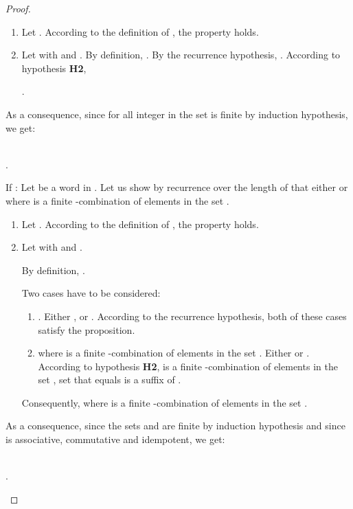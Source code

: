 \documentclass{article}
\begin{document}
\begin{proof}
          \begin{enumerate}
            \item Let . According to the definition of , the property holds.
            \item Let  with  and . By definition,   . By the recurrence hypothesis,  . According to hypothesis \textbf{H2},
            
            \centerline{   }
            
            \centerline{ .}
            
          \end{enumerate}  
          
         As a consequence, since for all integer  in  the set  is finite by induction hypothesis, we get:
       \begin{center}
        \\
        .
      \end{center}
    
    If :
        Let  be a word in .
          Let us show by recurrence over the length of  that either  or  where  is a finite -combination of elements in the set .
          
          \begin{enumerate}
            \item Let . According to the definition of , the property holds.
            \item Let  with  and .
            
            By definition, .
            
            Two cases have to be considered:
             
             \begin{enumerate}
               \item . Either  , or . According to the recurrence hypothesis, both of these cases satisfy the proposition.
               
               \item  where  is a finite -combination of elements in the set . Either  or . According to hypothesis \textbf{H2},  is a finite -combination of elements in the set , set that equals  is a suffix of .
             \end{enumerate} 
             
             Consequently,  where  is a finite -combination of elements in the set . 
          \end{enumerate} 
          
          As a consequence, since the sets  and  are finite by induction hypothesis and since  is associative, commutative and idempotent,  we get:
          
         \begin{center}
            \\
            .
         \end{center}
         
\end{proof}
  
\end{document}
